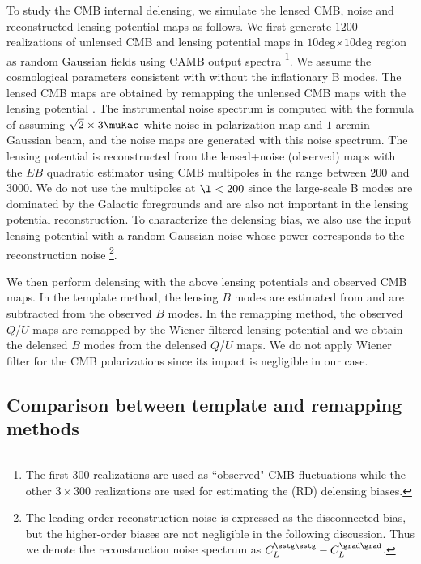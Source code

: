 \documentclass[aps,prd,twocolumn,superscriptaddress,groupedaddress,nofootinbib]{revtex4}
\begin{document}
To study the CMB internal delensing, we simulate the lensed CMB, noise and reconstructed lensing potential maps 
as follows. 
We first generate $1200$ realizations of unlensed CMB and lensing potential maps in $10$deg$\times 10$deg region
as random Gaussian fields using CAMB output spectra \cite{Lewis:1999bs} 
\footnote{
The first $300$ realizations are used as ``observed" CMB fluctuations while the other $3\times 300$ realizations are 
used for estimating the (RD) delensing biases. 
}.
We assume the cosmological parameters consistent with  without the inflationary B modes. 
The lensed CMB maps are obtained by remapping the unlensed CMB maps with the lensing potential \cite{Louis:2013}. 
The instrumental noise spectrum is computed with the formula of  
assuming $\sqrt{2}\times 3\muKac$ white noise in polarization map and $1$ arcmin Gaussian beam, 
and the noise maps are generated with this noise spectrum. 
The lensing potential is reconstructed from the lensed+noise (observed) maps with the $EB$ quadratic estimator 
using CMB multipoles in the range between $200$ and $3000$. 
We do not use the multipoles at $\l<200$ since the large-scale B modes are dominated by the Galactic foregrounds 
and are also not important in the lensing potential reconstruction. 
To characterize the delensing bias, we also use the input lensing potential with 
a random Gaussian noise whose power corresponds to the reconstruction noise
\footnote{
The leading order reconstruction noise is expressed as the disconnected bias, but the higher-order biases 
are not negligible in the following discussion. 
Thus we denote the reconstruction noise spectrum as $C_L^{\estg\estg}-C_L^{\grad\grad}$. 
}. 

We then perform delensing with the above lensing potentials and observed CMB maps. 
In the template method, the lensing $B$ modes are estimated from  and are subtracted from 
the observed $B$ modes. In the remapping method, the observed $Q$/$U$ maps are remapped by 
the Wiener-filtered lensing potential and we obtain the delensed $B$ modes from the delensed $Q$/$U$ maps. 
We do not apply Wiener filter for the CMB polarizations since its impact is negligible in our case. 

\subsection{Comparison between template and remapping methods}
\end{document}
